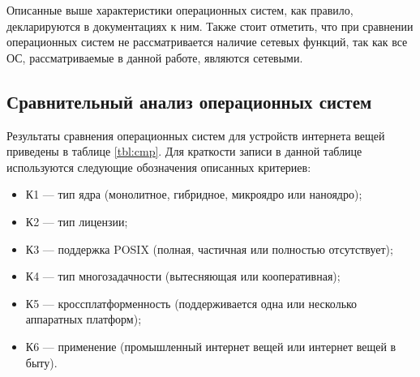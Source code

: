 Описанные выше характеристики операционных систем, как правило, декларируются в документациях к ним. Также стоит отметить, что при сравнении операционных систем не рассматривается наличие сетевых функций, так как все ОС, рассматриваемые в данной работе, являются сетевыми.



\subsection{Сравнительный анализ операционных систем}

Результаты сравнения операционных систем для устройств интернета вещей приведены в таблице \ref{tbl:cmp}. Для краткости записи в данной таблице используются следующие
обозначения описанных критериев:

\begin{itemize}[label*=---]
	\item К1 --- тип ядра (монолитное, гибридное, микроядро или наноядро);
	\item К2 --- тип лицензии;
	\item К3 --- поддержка POSIX (полная, частичная или полностью отсутствует);
	\item К4 --- тип многозадачности (вытесняющая или кооперативная);
	\item К5 --- кроссплатформенность (поддерживается одна или несколько аппаратных платформ);
	\item К6 --- применение (промышленный интернет вещей или интернет вещей в быту).
\end{itemize}



